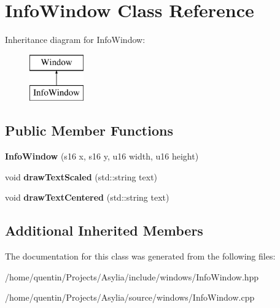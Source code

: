 \hypertarget{classInfoWindow}{\section{Info\-Window Class Reference}
\label{classInfoWindow}
}
Inheritance diagram for Info\-Window\-:\begin{figure}[H]
\begin{center}
\leavevmode
\includegraphics[height=2.000000cm]{classInfoWindow}
\end{center}
\end{figure}
\subsection*{Public Member Functions}
\begin{DoxyCompactItemize}
\item 
\hypertarget{classInfoWindow_abdb33caf040308ccbbcb0628a1745e7b}{{\bfseries Info\-Window} (s16 x, s16 y, u16 width, u16 height)}\label{classInfoWindow_abdb33caf040308ccbbcb0628a1745e7b}

\item 
\hypertarget{classInfoWindow_a198107b7576411592ba2bb9b11578d9b}{void {\bfseries draw\-Text\-Scaled} (std\-::string text)}\label{classInfoWindow_a198107b7576411592ba2bb9b11578d9b}

\item 
\hypertarget{classInfoWindow_a5893404c1f469c98d670cbaeef2a5bdb}{void {\bfseries draw\-Text\-Centered} (std\-::string text)}\label{classInfoWindow_a5893404c1f469c98d670cbaeef2a5bdb}

\end{DoxyCompactItemize}
\subsection*{Additional Inherited Members}


The documentation for this class was generated from the following files\-:\begin{DoxyCompactItemize}
\item 
/home/quentin/\-Projects/\-Asylia/include/windows/Info\-Window.\-hpp\item 
/home/quentin/\-Projects/\-Asylia/source/windows/Info\-Window.\-cpp\end{DoxyCompactItemize}

